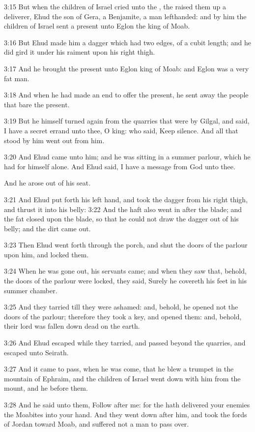 3:15 But when the children of Israel cried unto the \LORD, the \LORD
raised them up a deliverer, Ehud the son of Gera, a Benjamite, a man
lefthanded: and by him the children of Israel sent a present unto
Eglon the king of Moab.

3:16 But Ehud made him a dagger which had two edges, of a cubit
length; and he did gird it under his raiment upon his right thigh.

3:17 And he brought the present unto Eglon king of Moab: and Eglon was
a very fat man.

3:18 And when he had made an end to offer the present, he sent away
the people that bare the present.

3:19 But he himself turned again from the quarries that were by
Gilgal, and said, I have a secret errand unto thee, O king: who said,
Keep silence. And all that stood by him went out from him.

3:20 And Ehud came unto him; and he was sitting in a summer parlour,
which he had for himself alone. And Ehud said, I have a message from
God unto thee.

And he arose out of his seat.

3:21 And Ehud put forth his left hand, and took the dagger from his
right thigh, and thrust it into his belly: 3:22 And the haft also went
in after the blade; and the fat closed upon the blade, so that he
could not draw the dagger out of his belly; and the dirt came out.

3:23 Then Ehud went forth through the porch, and shut the doors of the
parlour upon him, and locked them.

3:24 When he was gone out, his servants came; and when they saw that,
behold, the doors of the parlour were locked, they said, Surely he
covereth his feet in his summer chamber.

3:25 And they tarried till they were ashamed: and, behold, he opened
not the doors of the parlour; therefore they took a key, and opened
them: and, behold, their lord was fallen down dead on the earth.

3:26 And Ehud escaped while they tarried, and passed beyond the
quarries, and escaped unto Seirath.

3:27 And it came to pass, when he was come, that he blew a trumpet in
the mountain of Ephraim, and the children of Israel went down with him
from the mount, and he before them.

3:28 And he said unto them, Follow after me: for the \LORD hath
delivered your enemies the Moabites into your hand. And they went down
after him, and took the fords of Jordan toward Moab, and suffered not
a man to pass over.

